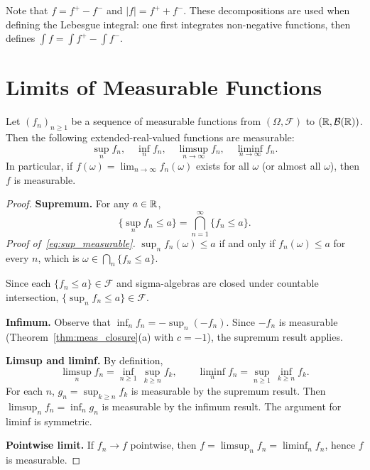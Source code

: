 \documentclass[11pt,a4paper]{article}
\begin{document}
\begin{remark}
Note that $f = f^+ - f^-$ and $|f| = f^+ + f^-$. These decompositions
are used when defining the Lebesgue integral: one first integrates
non-negative functions, then defines $\int f = \int f^+ - \int f^-$.
\end{remark}


\section{Limits of Measurable Functions}
\label{sec:limits}

\begin{theorem}
\label{thm:meas_limits}
Let $(f_n)_{n \geq 1}$ be a sequence of measurable functions from
$(\Omega, \mathcal{F})$ to $(\mathbb{R}, \mathcal{B}(\mathbb{R}))$. Then the following
extended-real-valued functions are measurable:
\begin{equation}
  \sup_n f_n, \quad \inf_n f_n, \quad
  \limsup_{n \to \infty} f_n, \quad \liminf_{n \to \infty} f_n.
  \label{eq:limits_measurable}
\end{equation}
In particular, if $f(\omega) = \lim_{n \to \infty} f_n(\omega)$ exists for
all $\omega$ (or almost all $\omega$), then $f$ is measurable.
\end{theorem}

\begin{proof}
\textbf{Supremum.} For any $a \in \mathbb{R}$,
\begin{equation}
  \{\sup_n f_n \leq a\} = \bigcap_{n=1}^\infty \{f_n \leq a\}.
  \label{eq:sup_measurable}
\end{equation}
\textit{Proof of~\eqref{eq:sup_measurable}.}
$\sup_n f_n(\omega) \leq a$ if and only if $f_n(\omega) \leq a$ for every
$n$, which is $\omega \in \bigcap_n \{f_n \leq a\}$.

Since each $\{f_n \leq a\} \in \mathcal{F}$ and sigma-algebras are closed
under countable intersection, $\{\sup_n f_n \leq a\} \in \mathcal{F}$.

\textbf{Infimum.} Observe that $\inf_n f_n = -\sup_n (-f_n)$. Since $-f_n$
is measurable (Theorem~\ref{thm:meas_closure}(a) with $c = -1$), the
supremum result applies.

\textbf{Limsup and liminf.} By definition,
\begin{equation}
  \limsup_{n} f_n = \inf_{n \geq 1}\, \sup_{k \geq n} f_k, \qquad
  \liminf_{n} f_n = \sup_{n \geq 1}\, \inf_{k \geq n} f_k.
\end{equation}
For each $n$, $g_n = \sup_{k \geq n} f_k$ is measurable by the supremum
result. Then $\limsup_n f_n = \inf_n g_n$ is measurable by the infimum
result. The argument for liminf is symmetric.

\textbf{Pointwise limit.} If $f_n \to f$ pointwise, then
$f = \limsup_n f_n = \liminf_n f_n$, hence $f$ is measurable.
\end{proof}
\end{document}
